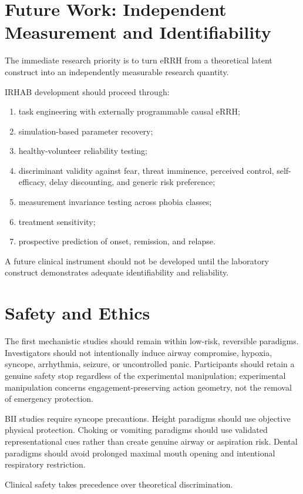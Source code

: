 \documentclass[9pt,twocolumn]{article}
\begin{document}
\section{Future Work: Independent Measurement and Identifiability}
The immediate research priority is to turn eRRH from a theoretical latent construct into an independently measurable research quantity.

IRHAB development should proceed through:
\begin{enumerate}[leftmargin=2em]
\item task engineering with externally programmable causal eRRH;
\item simulation-based parameter recovery;
\item healthy-volunteer reliability testing;
\item discriminant validity against fear, threat imminence, perceived control, self-efficacy, delay discounting, and generic risk preference;
\item measurement invariance testing across phobia classes;
\item treatment sensitivity;
\item prospective prediction of onset, remission, and relapse.
\end{enumerate}

A future clinical instrument should not be developed until the laboratory construct demonstrates adequate identifiability and reliability.

\section{Safety and Ethics}
The first mechanistic studies should remain within low-risk, reversible paradigms. Investigators should not intentionally induce airway compromise, hypoxia, syncope, arrhythmia, seizure, or uncontrolled panic. Participants should retain a genuine safety stop regardless of the experimental manipulation; experimental manipulation concerns engagement-preserving action geometry, not the removal of emergency protection.

BII studies require syncope precautions. Height paradigms should use objective physical protection. Choking or vomiting paradigms should use validated representational cues rather than create genuine airway or aspiration risk. Dental paradigms should avoid prolonged maximal mouth opening and intentional respiratory restriction.

Clinical safety takes precedence over theoretical discrimination.
\end{document}
